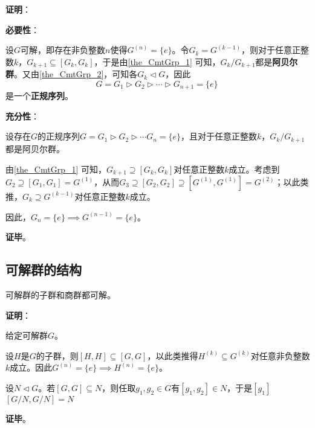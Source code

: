 \textbf{证明}：

\textbf{必要性}：

设$G$可解，即存在非负整数$n$使得$G^{(n)}=\{e\}$。令$G_k=G^{(k-1)}$，则对于任意正整数$k$，$G_{k+1}\subseteq [G_k, G_k]$，于是由\autoref{the_CmtGrp_1} 可知，$G_k/G_{k+1}$都是\textbf{阿贝尔群}。又由\autoref{the_CmtGrp_2}，可知各$G_k\lhd G$，因此
\begin{equation}
G=G_1\rhd G_2\rhd\cdots\rhd G_{n+1}=\{e\}~
\end{equation}
是一个\textbf{正规序列}。

\textbf{充分性}：

设存在$G$的正规序列$G=G_1\rhd G_2\rhd\cdots G_n=\{e\}$，且对于任意正整数$k$，$G_k/G_{k+1}$都是阿贝尔群。

由\autoref{the_CmtGrp_1} 可知，$G_{k+1}\supseteq [G_k, G_k]$对任意正整数$k$成立。考虑到$G_2\supseteq[G_1, G_1]=G^{(1)}$，从而$G_3\supseteq[G_2, G_2]\supseteq [G^{(1)}, G^{(1)}]=G^{(2)}$；以此类推，$G_{k}\supseteq G^{(k-1)}$对任意正整数$k$成立。

因此，$G_n=\{e\}\implies G^{(n-1)}=\{e\}$。

\textbf{证毕}。




\subsection{可解群的结构}



\begin{lemma}{}
可解群的子群和商群都可解。
\end{lemma}



\textbf{证明}：

给定可解群$G$。

设$H$是$G$的子群，则$[H, H]\subseteq [G, G]$，以此类推得$H^{(k)}\subseteq G^{(k)}$对任意非负整数$k$成立。因此$G^{(n)}=\{e\}\implies H^{(n)}=\{e\}$。

设$N\lhd G$。若$[G, G]\subseteq N$，则任取$g_1, g_2\in G$有$[g_1, g_2]\in N$，于是$[g_1]$
$[G/N, G/N]=N$


\textbf{证毕}。
































